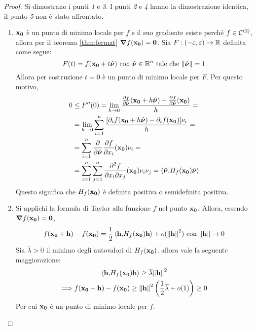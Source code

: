 \begin{proof}
    Si dimostrano i punti \textit{1} e \textit{3}. I punti \textit{2} e \textit{4} hanno la dimostrazione identica, il punto \textit{5} non è stato affrontato.
    \begin{enumerate}
        \item $\vb{x_0}$ è un punto di minimo locale per $f$ e il suo gradiente esiste perché $f\in\mathcal{C}^{(2)}$, allora per il teorema \ref{thm:fermat} $\grad f(\vb{x_0}) = \vb{0}$. Sia $F:(-\varepsilon,\varepsilon)\to \mathbb{R}$ definita come segue:
        $$
            F(t)=f(\vb{x_0}+t\hat{\bm\nu})\text{ con } \hat{\bm\nu} \in \mathbb{R}^n\text{ tale che } \norm{\hat{\bm\nu}}=1
        $$
        Allora per costruzione $t=0$ è un punto di minimo locale per $F$. Per questo motivo,
        \begin{align*}
            0&\leq F''(0)
            =\lim_{h\to 0}\frac{\frac{\partial f}{\partial \hat{\bm\nu}}(\vb{x_0}+h\hat{\bm\nu})-\frac{\partial f}{\partial \hat{\bm\nu}}(\vb{x_0})}{h}=\\
            &=\lim_{h\to 0}\sum_{i=1}^n\frac{[\partial_i f(\vb{x_0} + h\hat{\bm\nu})-\partial_i f(\vb{x_0})]\nu_i}{h}=\\
            &=\sum_{i=1}^{n}\frac{\partial}{\partial \hat{\bm\nu}}\frac{\partial f}{\partial x_i}(\vb{x_0})\nu_i=\\
            &=\sum_{i=1}^n\sum_{j=1}^{n}\frac{\partial^2 f}{\partial x_i \partial x_j}(\vb{x_0})\nu_i\nu_j=\left\langle\hat{\bm\nu}{,}H_f(\vb{x_0})\hat{\bm\nu}\right\rangle
        \end{align*}
        Questo significa che $H_f(\vb{x_0})$ è definita positiva o semidefinita positiva.
        \addtocounter{enumi}{1}
        \item Si applichi la formula di Taylor alla funzione $f$ nel punto $\vb{x_0}$. Allora, essendo $\grad f(\vb{x_0})=\vb{0}$,
        $$
            f(\vb{x_0}+\vb{h})-f(\vb{x_0}) = \frac{1}{2}\left\langle\vb{h}{,}H_f(\vb{x_0})\vb{h}\right\rangle+o(\norm{\vb{h}}^2) \text{ con } \norm{\vb{h}}\to 0
        $$
        Sia $\overline{\lambda}>0$ il minimo degli autovalori di $H_f(\vb{x_0})$, allora vale la seguente maggiorazione:
        \begin{gather*} 
            \left\langle\vb{h}{,}H_f(\vb{x_0})\vb{h}\right\rangle\geq \overline{\lambda}\norm{\vb{h}}^2\\
            \Longrightarrow f(\vb{x_0}+\vb{h})-f(\vb{x_0})\geq \norm{\vb{h}}^2\left(\frac{1}{2}\overline{\lambda}+o(1)\right)\geq 0
        \end{gather*}
        Per cui $\vb{x_0}$ è un punto di minimo locale per $f$.
    \end{enumerate}
\end{proof}